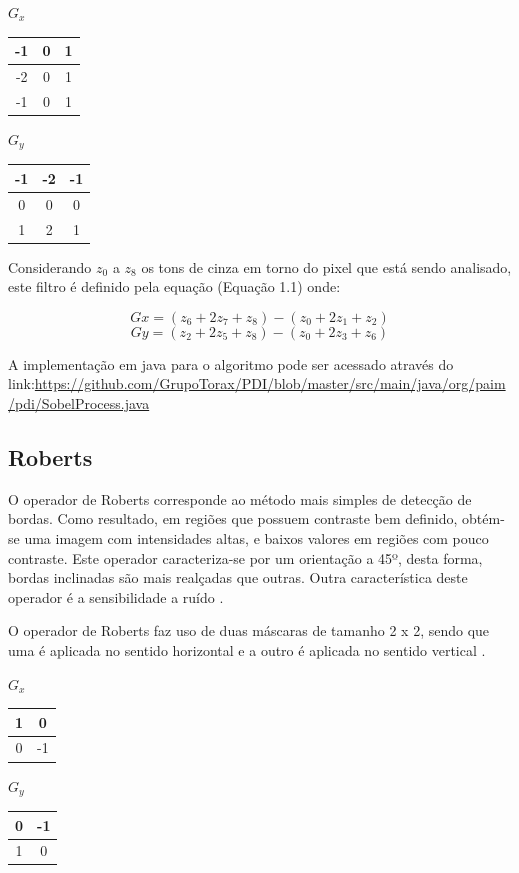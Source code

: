 \documentclass[
	12pt,				%
	oneside,			%
	a4paper,			%
	english,			%
	french,				%
	spanish,			%
	brazil,				%
	]{abntex2}
\begin{document}
\(G_x\)
\begin{tabular}{|c|c|c|}
	\hline
    -1 & 0 & 1   \\ \hline
	-2 & 0 & 1   \\ \hline   
	-1 & 0 & 1   \\ \hline   
\end{tabular}
\(G_y\)
\begin{tabular}{|c|c|c|}
    \hline
    -1 & -2 & -1   \\ \hline
	 0 &  0 & 0   \\ \hline   
	 1 &  2 & 1   \\ \hline   
\end{tabular}

Considerando \(z_0\) a \(z_8\) os tons de cinza em torno do pixel que está sendo analisado, este filtro é definido pela equação (Equação 1.1) onde:

\[Gx = (z_6 + 2z_7 + z_8) - (z_0 + 2z_1 + z_2)\]
\[Gy = (z_2 + 2z_5 + z_8) - (z_0 + 2z_3 + z_6)\]

A implementação em java para o algoritmo pode ser acessado através do link:\url{https://github.com/GrupoTorax/PDI/blob/master/src/main/java/org/paim/pdi/SobelProcess.java}

\subsection{Roberts}
O operador de Roberts corresponde ao método mais simples de detecção de bordas. Como resultado, em regiões que possuem contraste bem definido, obtém-se uma imagem com intensidades altas, e baixos valores em regiões com pouco contraste. Este operador caracteriza-se por um orientação a 45º, desta forma, bordas inclinadas são mais realçadas que outras. Outra característica deste operador é a sensibilidade a ruído \cite{conciAzevedoLeta:2008}.

O operador de Roberts faz uso de duas máscaras de tamanho 2 x 2, sendo que uma é aplicada no sentido horizontal e a outro é aplicada no sentido vertical \cite{pedriniSchwartz:2008}.

\(G_x\)
\begin{tabular}{|c|c|}
	\hline
    1 &  0    \\ \hline
	0 & -1    \\ \hline   
\end{tabular}
\(G_y\)
\begin{tabular}{|c|c|}
    \hline
    0 & -1   \\ \hline
	1 &  0   \\ \hline   
\end{tabular}
\end{document}

